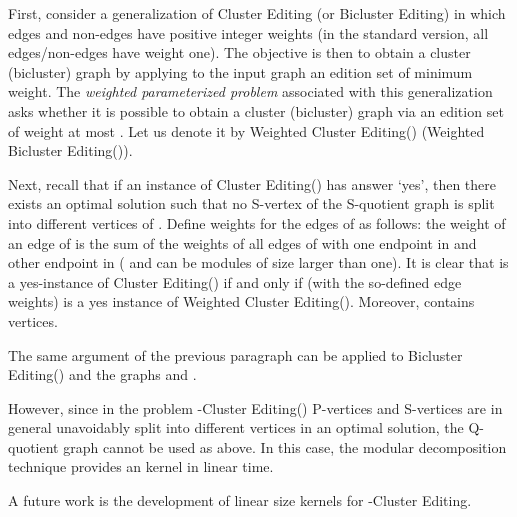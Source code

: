 \documentclass[12pt]{article}
\begin{document}
First, consider a generalization of {\sc Cluster Editing} (or {\sc Bicluster Editing}) in which edges and non-edges have positive integer weights (in the standard version, all edges/non-edges have weight one). The objective is then to obtain a cluster (bicluster) graph by applying to the input graph an edition set of minimum weight. The {\it weighted parameterized problem} associated with this generalization asks whether it is possible to obtain a cluster (bicluster) graph via an edition set of weight at most . Let us denote it by {\sc Weighted Cluster Editing()} ({\sc Weighted Bicluster Editing()}).

Next, recall that if an instance  of {\sc Cluster Editing()} has answer `yes', then there exists an optimal solution such that no S-vertex  of the S-quotient graph  is split into different vertices of . Define weights for the edges of  as follows: the weight of an edge  of  is the sum of the weights of all edges of  with one endpoint in  and other endpoint in  ( and  can be modules of size larger than one). It is clear that  is a yes-instance of {\sc Cluster Editing()} if and only if  (with the so-defined edge weights) is a yes instance of {\sc Weighted Cluster Editing()}. Moreover,  contains  vertices.

The same argument of the previous paragraph can be applied to {\sc Bicluster Editing()} and the graphs  and .

However, since in the problem {\sc -Cluster Editing()} P-vertices and S-vertices are in general unavoidably split into different vertices in an optimal solution, the Q-quotient graph  cannot be used as above. In this case, the modular decomposition technique provides an  kernel in linear time.

A future work is the development of linear size kernels for {\sc -Cluster Editing}.


\end{document}
